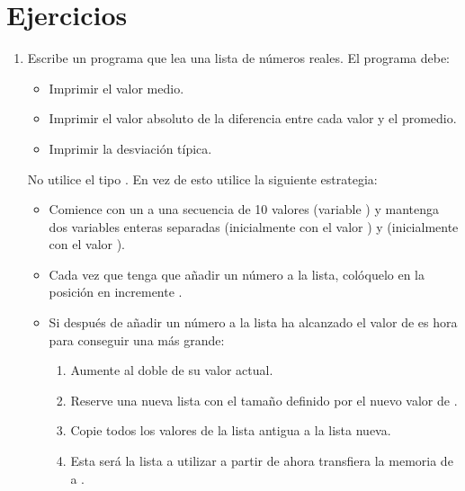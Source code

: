 \section{Ejercicios}

\begin{enumerate}

\item
Escribe un programa que lea una lista de números reales. El programa debe:

\begin{itemize}
  \item Imprimir el valor medio.
  \item Imprimir el valor absoluto de la diferencia entre cada valor y el promedio.
  \item Imprimir la desviación típica.
\end{itemize}

No utilice el tipo . En vez de esto utilice la siguiente estrategia:

\begin{itemize}
  \item Comience con un  a una secuencia de 10 valores
        (variable ) y mantenga dos variables enteras separadas 
         (inicialmente con el valor ) y  
        (inicialmente con el valor ).

  \item Cada vez que tenga que añadir un número a la lista, colóquelo en la posición
         en incremente .

  \item Si después de añadir un número a la lista  ha alcanzado el valor
        de  es hora para conseguir una  más grande:
    \begin{enumerate}
      \item Aumente  al doble de su valor actual.
      \item Reserve una nueva lista  con el tamaño definido por el 
            nuevo valor de .
      \item Copie todos los valores de la lista antigua a la lista nueva.
      \item Esta será la lista a utilizar a partir de ahora transfiera la memoria de
             a .
    \end{enumerate}
\end{itemize}

\end{enumerate}
